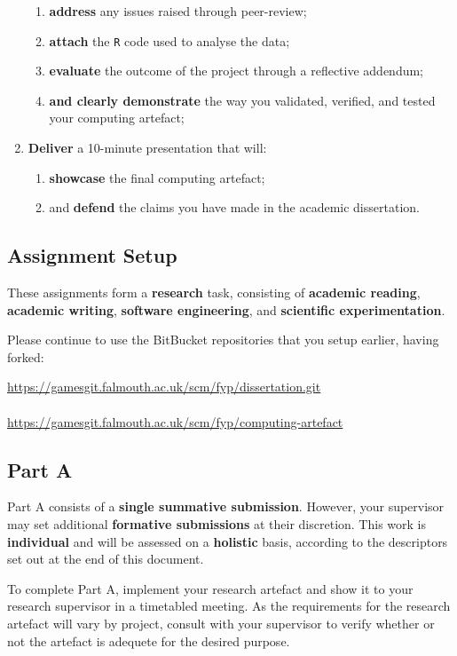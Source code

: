\begin{enumerate}[label=(\Alph*)]
\begin{enumerate}[label=(\roman*)]
			\item \textbf{address} any issues raised through peer-review;
			\item \textbf{attach} the \texttt{R} code used to analyse the data;
			\item \textbf{evaluate} the outcome of the project through a reflective addendum;
			\item \textbf{and clearly demonstrate} the way you validated, verified, and tested your computing artefact;
		\end{enumerate}
	\item \textbf{Deliver} a 10-minute presentation that will:
		\begin{enumerate}[label=(\roman*)]
			\item \textbf{showcase} the final computing artefact;
			\item and \textbf{defend} the claims you have made in the academic dissertation.
		\end{enumerate}
\end{enumerate}

\subsection*{Assignment Setup}

These assignments form a \textbf{research} task, consisting of \textbf{academic reading}, \textbf{academic writing},
\textbf{software engineering}, and \textbf{scientific experimentation}.

Please continue to use the BitBucket repositories that you setup earlier, having forked:

\indent \url{https://gamesgit.falmouth.ac.uk/scm/fyp/dissertation.git}\\
\\
\indent \url{https://gamesgit.falmouth.ac.uk/scm/fyp/computing-artefact}

\subsection*{Part A}

Part A consists of a \textbf{single summative submission}.
However, your supervisor may set additional \textbf{formative submissions} at their discretion.
This work is \textbf{individual} and will be assessed on a \textbf{holistic} basis, according to the descriptors set out at the end of this document.

To complete Part A, implement your research artefact and show it to your research supervisor in a timetabled meeting. As
the requirements for the research artefact will vary by project, consult with your supervisor to verify whether or not the
artefact is adequete for the desired purpose.

